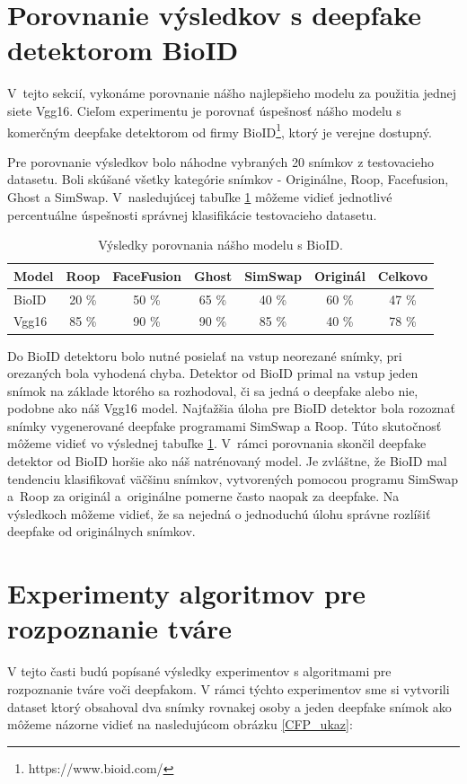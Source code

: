\section{Porovnanie výsledkov s deepfake detektorom BioID}
V~tejto sekcií, vykonáme porovnanie nášho najlepšieho modelu za použitia jednej siete Vgg16. Cieľom experimentu je porovnať úspešnosť nášho modelu s komerčným deepfake detektorom od firmy BioID\footnote{https://www.bioid.com/}, ktorý je verejne dostupný.

Pre porovnanie výsledkov bolo náhodne vybraných 20 snímkov z testovacieho datasetu. Boli skúšané všetky kategórie snímkov - Originálne, Roop, Facefusion, Ghost a SimSwap. V~nasledujúcej tabuľke \ref{tab:BioID_table} môžeme vidieť jednotlivé percentuálne úspešnosti správnej klasifikácie testovacieho datasetu.

\begin{table}[htbp]
\begin{tabular}{|l|c|c|c|c|c|c|}
\hline
\textbf{Model} & \textbf{Roop} & \textbf{FaceFusion} & \textbf{Ghost}  & \textbf{SimSwap} &  \textbf{Originál} & \textbf{Celkovo}\\
\hline
BioID & 20 \% & 50 \% & 65 \% & 40 \% & 60 \% & 47 \% \\
\hline
Vgg16 & 85 \% & 90 \% & 90 \% & 85 \% & 40 \% & 78 \% \\
\hline
\end{tabular}
\centering
\caption{Výsledky porovnania nášho modelu s BioID.}
\label{tab:BioID_table}
\end{table}

Do BioID detektoru bolo nutné posielať na vstup neorezané snímky, pri orezaných bola vyhodená chyba. Detektor od BioID primal na vstup jeden snímok na základe ktorého sa rozhodoval, či sa jedná o deepfake alebo nie, podobne ako náš Vgg16 model. Najťažšia úloha pre BioID detektor bola rozoznať snímky vygenerované deepfake programami SimSwap a Roop. Túto skutočnosť môžeme vidieť vo výslednej tabuľke \ref{tab:BioID_table}. V~rámci porovnania skončil deepfake detektor od BioID horšie ako náš natrénovaný model. Je zvláštne, že BioID mal tendenciu klasifikovať väčšinu snímkov, vytvorených pomocou programu SimSwap a~Roop za originál a~originálne pomerne často naopak za deepfake. Na výsledkoch môžeme vidieť, že sa nejedná o jednoduchú úlohu správne rozlíšiť deepfake od originálnych snímkov.

\section{Experimenty algoritmov pre rozpoznanie tváre}
V tejto časti budú popísané výsledky experimentov s algoritmami pre rozpoznanie tváre voči deepfakom. V rámci týchto experimentov sme si vytvorili dataset ktorý obsahoval dva snímky rovnakej osoby a jeden deepfake snímok ako môžeme názorne vidieť na nasledujúcom obrázku \ref{CFP_ukaz}:

